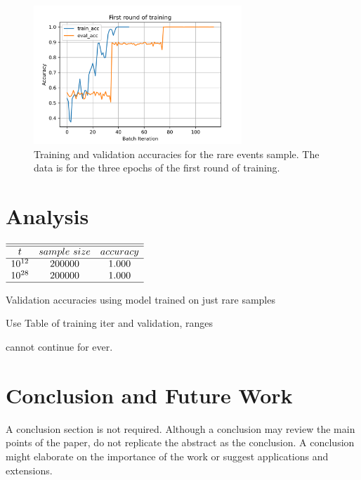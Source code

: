 \documentclass[journal]{IEEEtai}
\begin{document}
\begin{figure}
\centerline{\includegraphics[width=18.5pc]{Figure1.png}}
\caption{Training and validation accuracies for the rare events sample. The data is for 
the three epochs of the first round of training.}
\end{figure}


\section{Analysis}

\begin{table}
\centering \(\begin{array}{ccc}
\hline
\hline
t     &sample~size&accuracy\\
\hline
10^{12}  & 200000 & 1.000 \\

10^{28}  & 200000 & 1.000 \\
\hline
\end{array}\)
\caption{Validation accuracies using model trained on just  rare samples}
\label{tab:validation}
\end{table}

Use 
Table of training iter and validation, ranges

cannot continue for ever.


\section{Conclusion and Future Work}

A conclusion section is not required. Although a conclusion may review the main points of the paper, do not replicate the abstract as the conclusion. A conclusion might elaborate on the importance of the work or suggest applications and extensions.
\end{document}
